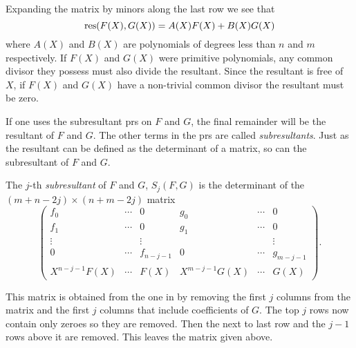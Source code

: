 Expanding the matrix by minors along the last row we see that 
\[
\mathop{\rm res}\nolimits(F(X), G(X)) = A(X) F(X) + B(X) G(X)
\]
where $A(X)$ and $B(X)$ are polynomials of degrees less than $n$ and
$m$ respectively.  If $F(X)$ and $G(X)$ were primitive polynomials,
any common divisor they possess must also divide the resultant.  Since
the resultant is free of $X$, if $F(X)$ and $G(X)$ have a non-trivial
common divisor the resultant must be zero.

\smallskip
If one uses the subresultant {\sc prs} on $F$ and $G$, the final
remainder will be the resultant of $F$ and $G$.  The other terms in
the {\sc prs} are called {\em subresultants\/}.
Just as the resultant can be defined as the determinant of a matrix,
so can the subresultant of $F$ and $G$.  

The $j$-th {\em subresultant} of $F$
and $G$, $S_j(F, G)$ is the determinant of the $(m+n - 2j)\times (n+m
-2j)$ matrix
\[
\begin{pmatrix}
f_0 & \cdots &  0  & g_0 & \cdots &  0 \\
f_1 & \cdots &  0  & g_1 & \cdots &  0 \\
\vdots &     & \vdots &  &     & \vdots \\
0 & \cdots &  f_{n-j-1} & 0 & \cdots  & g_{m-j-1} \\
X^{n-j-1} F(X) & \cdots & F(X)& X^{m-j-1} G(X) & \cdots & G(X)\end{pmatrix}.
\]

This matrix is obtained from the one in  by removing
the first $j$ columns from the matrix and the first $j$ columns that
include coefficients of $G$.  The top $j$ rows now contain only zeroes so
they are removed.  Then the next to last row and the $j-1$ rows above it
are removed.  This leaves the matrix given above.

